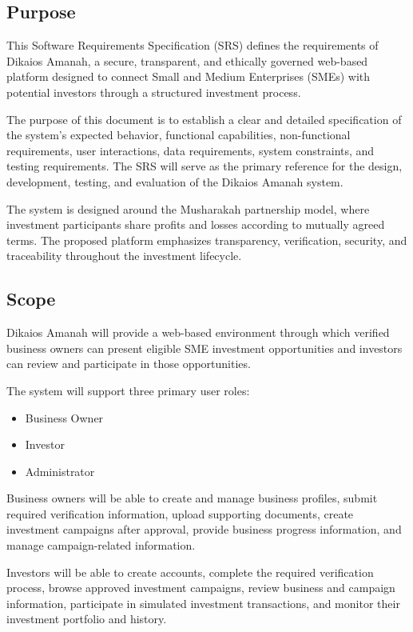 \subsection{Purpose}

This Software Requirements Specification (SRS) defines the requirements of
Dikaios Amanah, a secure, transparent, and ethically governed web-based
platform designed to connect Small and Medium Enterprises (SMEs) with
potential investors through a structured investment process.

The purpose of this document is to establish a clear and detailed
specification of the system's expected behavior, functional capabilities,
non-functional requirements, user interactions, data requirements, system
constraints, and testing requirements. The SRS will serve as the primary
reference for the design, development, testing, and evaluation of the
Dikaios Amanah system.

The system is designed around the Musharakah partnership model, where
investment participants share profits and losses according to mutually
agreed terms. The proposed platform emphasizes transparency, verification,
security, and traceability throughout the investment lifecycle.


\subsection{Scope}

Dikaios Amanah will provide a web-based environment through which verified
business owners can present eligible SME investment opportunities and
investors can review and participate in those opportunities.

The system will support three primary user roles:

\begin{itemize}
    \item Business Owner
    \item Investor
    \item Administrator
\end{itemize}

Business owners will be able to create and manage business profiles,
submit required verification information, upload supporting documents,
create investment campaigns after approval, provide business progress
information, and manage campaign-related information.

Investors will be able to create accounts, complete the required
verification process, browse approved investment campaigns, review
business and campaign information, participate in simulated investment
transactions, and monitor their investment portfolio and history.

